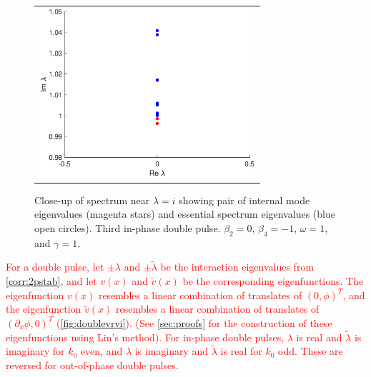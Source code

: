\documentclass[12pt]{elsarticle}
\newcommand{\revised}[1]{ \textcolor{red}{#1} }
\begin{document}
\begin{figure}[H]
\centering
\begin{tabular}{c}
\includegraphics[width=8cm]{images/DP3internalmode.eps}
\end{tabular}
\caption{Close-up of spectrum near $\lambda = i$ showing pair of internal mode eigenvalues (magenta stars) and essential spectrum eigenvalues (blue open circles). Third in-phase double pulse. $\beta_2 = 0$, $\beta_4 = -1$, $\omega = 1$, and $\gamma = 1$.}
\label{fig:doubleinternalmode}
\end{figure}

\revised{For a double pulse, let $\pm \lambda$ and $\pm \tilde{\lambda}$ be the interaction eigenvalues from \cref{corr:2pstab}, and let $v(x)$ and $\tilde{v}(x)$ be the corresponding eigenfunctions. The eigenfunction $v(x)$ resembles a linear combination of translates of $(0, \phi)^T$, and the eigenfunction $\tilde{v}(x)$ resembles a linear combination of translates of $(\partial_x \phi, 0)^T$ (\cref{fig:doublevrvi}).  (See \cref{sec:proofs} for the construction of these eigenfunctions using Lin's method). For in-phase double pulses, $\lambda$ is real and $\tilde{\lambda}$ is imaginary for $k_0$ even, and $\lambda$ is imaginary and $\tilde{\lambda}$ is real for $k_0$ odd. These are reversed for out-of-phase double pulses.}
\end{document}
